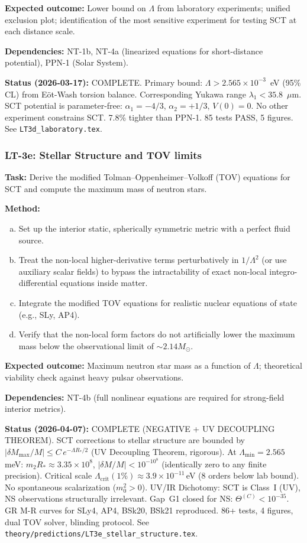 \documentclass[12pt,a4paper]{article}
\newcommand{\task}[1]{\noindent\textbf{Task:} #1\par}
\newcommand{\method}[1]{\noindent\textbf{Method:} #1\par}
\newcommand{\outcome}[1]{\noindent\textbf{Expected outcome:} #1\par}
\newcommand{\deps}[1]{\noindent\textbf{Dependencies:} #1\par}
\begin{document}
\outcome{Lower bound on $\Lambda$ from laboratory experiments; unified
exclusion plot; identification of the most sensitive experiment for
testing SCT at each distance scale.}

\deps{NT-1b, NT-4a (linearized equations for short-distance potential),
PPN-1 (Solar System).}

\textbf{Status (2026-03-17):} \textcolor{proven}{COMPLETE.}
Primary bound: $\Lambda > 2.565 \times 10^{-3}$~eV (95\% CL) from E\"ot-Wash torsion balance.
Corresponding Yukawa range $\lambda_1 < 35.8$~$\mu$m.
SCT potential is parameter-free: $\alpha_1 = -4/3$, $\alpha_2 = +1/3$, $V(0) = 0$.
No other experiment constrains SCT. 7.8\% tighter than PPN-1.
85 tests PASS, 5 figures. See \texttt{LT3d\_laboratory.tex}.

\subsubsection{LT-3e: Stellar Structure and TOV limits}
\label{task:LT3e}

\task{Derive the modified Tolman--Oppenheimer--Volkoff (TOV) equations for SCT and compute the maximum mass of neutron stars.}

\method{
\begin{enumerate}[(a)]
  \item Set up the interior static, spherically symmetric metric with a perfect fluid source.
  \item Treat the non-local higher-derivative terms perturbatively in $1/\Lambda^2$ (or use auxiliary scalar fields) to bypass the intractability of exact non-local integro-differential equations inside matter.
  \item Integrate the modified TOV equations for realistic nuclear equations of state (e.g., SLy, AP4).
  \item Verify that the non-local form factors do not artificially lower the maximum mass below the observational limit of $\sim 2.14 M_\odot$.
\end{enumerate}
}

\outcome{Maximum neutron star mass as a function of $\Lambda$; theoretical viability check against heavy pulsar observations.}

\deps{NT-4b (full nonlinear equations are required for strong-field interior metrics).}

\textbf{Status (2026-04-07):} \textcolor{proven}{COMPLETE (NEGATIVE + UV DECOUPLING THEOREM).}
SCT corrections to stellar structure are bounded by
$|\delta M_{\max}/M| \leq C\,e^{-\Lambda R_*/2}$ (UV Decoupling Theorem, rigorous).
At $\Lambda_{\min} = 2.565$\,meV: $m_2 R_* \approx 3.35 \times 10^8$,
$|\delta M/M| < 10^{-10^8}$ (identically zero to any finite precision).
Critical scale $\Lambda_{\mathrm{crit}}(1\%) \approx 3.9 \times 10^{-11}$\,eV
(8 orders below lab bound). No spontaneous scalarization ($m_0^2 > 0$).
UV/IR Dichotomy: SCT is Class~I (UV), NS observations structurally irrelevant.
Gap~G1 closed for NS: $\Theta^{(C)} < 10^{-35}$.
GR M-R curves for SLy4, AP4, BSk20, BSk21 reproduced.
86+ tests, 4 figures, dual TOV solver, blinding protocol.
See \texttt{theory/predictions/LT3e\_stellar\_structure.tex}.
\end{document}
